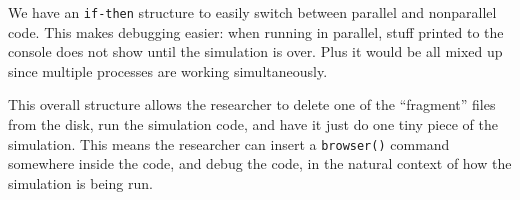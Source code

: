 \documentclass[
]{book}
\newenvironment{Shaded}{\begin{snugshade}}{\end{snugshade}}
\newcommand{\AttributeTok}[1]{\textcolor[rgb]{0.77,0.63,0.00}{#1}}
\newcommand{\CommentTok}[1]{\textcolor[rgb]{0.56,0.35,0.01}{\textit{#1}}}
\newcommand{\ConstantTok}[1]{\textcolor[rgb]{0.00,0.00,0.00}{#1}}
\newcommand{\ControlFlowTok}[1]{\textcolor[rgb]{0.13,0.29,0.53}{\textbf{#1}}}
\newcommand{\DecValTok}[1]{\textcolor[rgb]{0.00,0.00,0.81}{#1}}
\newcommand{\FunctionTok}[1]{\textcolor[rgb]{0.00,0.00,0.00}{#1}}
\newcommand{\NormalTok}[1]{#1}
\newcommand{\OtherTok}[1]{\textcolor[rgb]{0.56,0.35,0.01}{#1}}
\newcommand{\SpecialCharTok}[1]{\textcolor[rgb]{0.00,0.00,0.00}{#1}}
\begin{document}
We have an \texttt{if-then} structure to easily switch between parallel and nonparallel code.
This makes debugging easier: when running in parallel, stuff printed to the console does not show until the simulation is over.
Plus it would be all mixed up since multiple processes are working simultaneously.

This overall structure allows the researcher to delete one of the ``fragment'' files from the disk, run the simulation code, and have it just do one tiny piece of the simulation.
This means the researcher can insert a \texttt{browser()} command somewhere inside the code, and debug the code, in the natural context of how the simulation is being run.

\begin{Shaded}
\end{Shaded}
\end{document}
